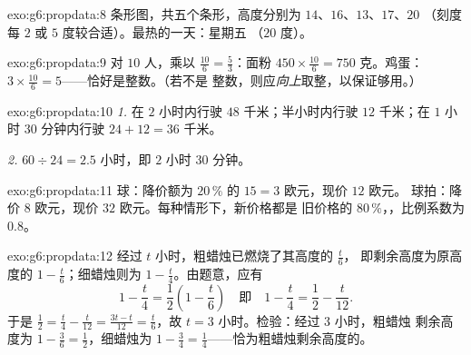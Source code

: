 \begin{solution}{exo:g6:propdata:8}
条形图，共五个条形，高度分别为 $14$、$16$、$13$、$17$、$20$
（刻度每 $2$ 或 $5$ 度较合适）。最热的一天：星期五
（$20$ 度）。
\end{solution}

\begin{solution}{exo:g6:propdata:9}
对 $10$ 人，乘以 $\frac{10}{6} = \frac53$：面粉
$450 \times \frac{10}{6} = 750$ 克。鸡蛋：
$3 \times \frac{10}{6} = 5$——恰好是整数。（若不是
整数，则应\emph{向上}取整，以保证够用。）
\end{solution}

\begin{solution}{exo:g6:propdata:10}
\emph{1.} 在 $2$ 小时内行驶 $48$ 千米；半小时内行驶 $12$ 千米；在
$1$ 小时 $30$ 分钟内行驶 $24 + 12 = 36$ 千米。

\emph{2.} $60 \div 24 = 2.5$ 小时，即 $2$ 小时 $30$ 分钟。
\end{solution}

\begin{solution}{exo:g6:propdata:11}
球：降价额为 $20\,\%$ 的 $15 = 3$ 欧元，现价 $12$ 欧元。
球拍：降价 $8$ 欧元，现价 $32$ 欧元。每种情形下，新价格都是
旧价格的 $80\,\%$，，比例系数为
$0.8$。
\end{solution}

\begin{solution}{exo:g6:propdata:12}
经过 $t$ 小时，粗蜡烛已燃烧了其高度的 $\frac t6$，
即剩余高度为原高度的 $1 - \frac t6$；细蜡烛则为
$1 - \frac t4$。由题意，应有
\[
1 - \frac t4 = \frac12 \left(1 - \frac t6\right)
\quad\text{即}\quad
1 - \frac t4 = \frac12 - \frac t{12}.
\]
于是 $\frac12 = \frac t4 - \frac t{12} = \frac{3t - t}{12} =
\frac{t}{6}$，故 $t = 3$ 小时。检验：经过 $3$ 小时，粗蜡烛
剩余高度为 $1 - \frac36 = \frac12$，细蜡烛为
$1 - \frac34 = \frac14$——恰为粗蜡烛剩余高度的。
\end{solution}

